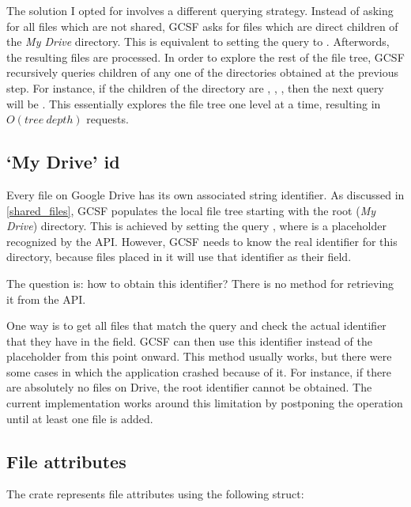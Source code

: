The solution I opted for involves a different querying strategy. Instead of asking for all files which are not shared, GCSF asks for files which are direct children of the \emph{My Drive} directory. This is equivalent to setting the query to . Afterwords, the resulting files are processed. In order to explore the rest of the file tree, GCSF recursively queries children of any one of the directories obtained at the previous step. For instance, if the children of the  directory are , , , then the next query will be . This essentially explores the file tree one level at a time, resulting in $ O(tree~depth) $ requests.

\subsection{`My Drive' id}

Every file on Google Drive has its own associated string identifier. As discussed in \ref{shared_files}, GCSF populates the local file tree starting with the root (\emph{My Drive}) directory. This is achieved by setting the query , where  is a placeholder recognized by the API. However, GCSF needs to know the real identifier for this directory, because files placed in it will use that identifier as their  field.

The question is: how to obtain this identifier? There is no method for retrieving it from the API.

One way is to get all files that match the  query and check the actual identifier that they have in the  field. GCSF can then use this identifier instead of the  placeholder from this point onward. This method usually works, but there were some cases in which the application crashed because of it. For instance, if there are absolutely no files on Drive, the root identifier cannot be obtained. The current implementation works around this limitation by postponing the operation until at least one file is added.

\subsection{File attributes}

The  crate represents file attributes using the following struct:

